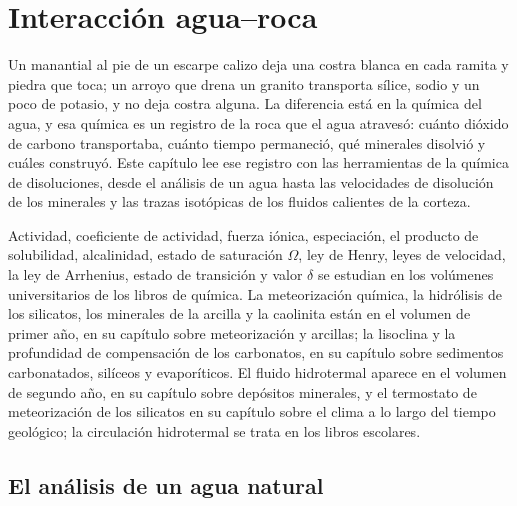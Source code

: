 \chapter{Interacción agua--roca}\label{ch:b3:water-rock-interaction}

Un manantial al pie de un escarpe calizo deja una costra blanca en cada ramita
y piedra que toca; un arroyo que drena un granito transporta sílice, sodio y
un poco de potasio, y no deja costra alguna. La diferencia está en la química
del agua, y esa química es un registro de la roca que el agua atravesó: cuánto
dióxido de carbono transportaba, cuánto tiempo permaneció, qué minerales disolvió
y cuáles construyó. Este capítulo lee ese registro con las herramientas de la
química de disoluciones, desde el análisis de un agua hasta las velocidades de
disolución de los minerales y las trazas isotópicas de los fluidos calientes de la corteza.

\begin{recall}
Actividad, coeficiente de actividad, fuerza iónica, especiación, el producto de
solubilidad, alcalinidad, estado de saturación $\Omega$, ley de Henry, leyes de velocidad,
la ley de Arrhenius, estado de transición y valor $\delta$ se estudian en
los volúmenes universitarios de los libros de química. La meteorización química, la hidrólisis de
los silicatos, los minerales de la arcilla y la caolinita están en el volumen de primer año, en su
capítulo sobre meteorización y arcillas; la lisoclina y la profundidad de compensación de
los carbonatos, en su capítulo sobre sedimentos carbonatados, silíceos y evaporíticos. El fluido
hidrotermal aparece en el volumen de segundo año, en su capítulo sobre depósitos minerales, y
el termostato de meteorización de los silicatos en su capítulo sobre el clima a lo largo
del tiempo geológico; la circulación hidrotermal se trata en los libros escolares.
\end{recall}

\section{El análisis de un agua natural}\label{sec:b3:water-rock-interaction:analysis}

